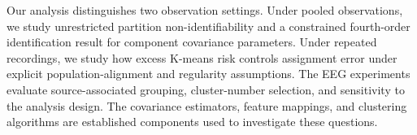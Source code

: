 Our analysis distinguishes two observation settings. Under pooled
observations, we study unrestricted partition non-identifiability and a
constrained fourth-order identification result for component covariance
parameters. Under repeated recordings, we study how excess K-means risk
controls assignment error under explicit population-alignment and
regularity assumptions. The EEG experiments evaluate source-associated
grouping, cluster-number selection, and sensitivity to the analysis
design. The covariance estimators, feature mappings, and clustering
algorithms are established components used to investigate these
questions.
